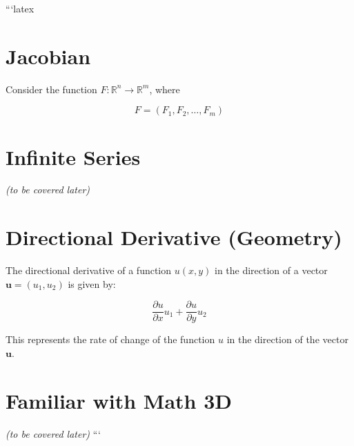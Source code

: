 ```latex
\section*{Jacobian}

Consider the function \( F : \mathbb{R}^n \to \mathbb{R}^m \), where

\[
F = (F_1, F_2, \ldots, F_m)
\]

\section*{Infinite Series}

\emph{(to be covered later)}

\section*{Directional Derivative (Geometry)}

The directional derivative of a function \( u(x, y) \) in the direction of a vector \(\mathbf{u} = (u_1, u_2)\) is given by:

\[
\frac{\partial u}{\partial x} u_1 + \frac{\partial u}{\partial y} u_2
\]

This represents the rate of change of the function \( u \) in the direction of the vector \(\mathbf{u}\).

\section*{Familiar with Math 3D}

\emph{(to be covered later)}
```

